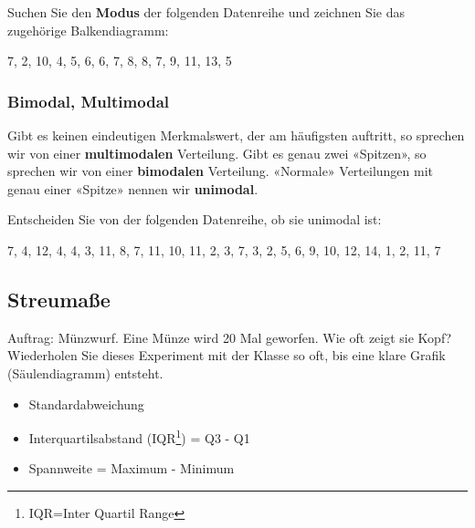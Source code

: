 Suchen Sie den \textbf{Modus} der folgenden Datenreihe und zeichnen Sie das
zugehörige Balkendiagramm:

7, 2, 10,  4, 5, 6, 6, 7, 8, 8, 7, 9, 11, 13, 5

\TNTeop{}



\subsubsection{Bimodal, Multimodal}
Gibt es keinen eindeutigen Merkmalswert, der am häufigsten auftritt,
so sprechen wir von einer \textbf{multimodalen} Verteilung. Gibt es
genau zwei «Spitzen», so sprechen wir von einer \textbf{bimodalen}
Verteilung. «Normale» Verteilungen mit genau einer «Spitze» nennen wir \textbf{unimodal}.



Entscheiden Sie von der folgenden Datenreihe, ob sie unimodal ist:

7, 4, 12, 4, 4, 3,  11, 8, 7, 11, 10, 11, 2, 3, 7, 3, 2, 5, 6, 9, 10, 12, 14, 1, 2, 11, 7



\subsection{Streumaße}
Auftrag: Münzwurf. Eine Münze wird 20 Mal geworfen. Wie oft zeigt sie Kopf? Wiederholen Sie dieses Experiment mit der Klasse so oft, bis eine klare Grafik (Säulendiagramm) entsteht.


\begin{itemize}
\item Standardabweichung

\item Interquartilsabstand (IQR\footnote{IQR=Inter Quartil
    Range}) = Q3 - Q1

\item Spannweite = Maximum - Minimum

\end{itemize}

